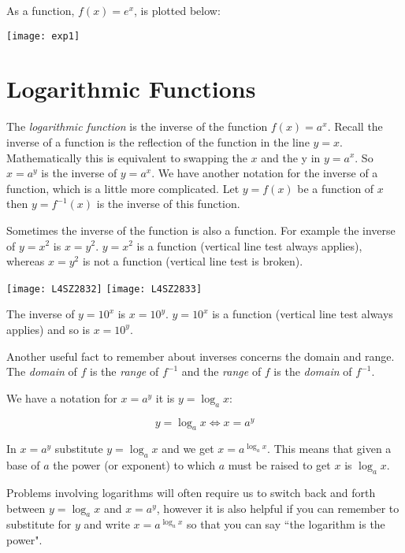 As a function, $f(x)=e^x$, is plotted below:
\begin{center}
	\texttt{[image: exp1]}
\end{center}
\section{Logarithmic Functions}
The \emph{logarithmic function} is the inverse of the function $f (x) =a^{x}$. Recall the inverse of a function is the reflection of the function in the line $y =x$. Mathematically this is equivalent to swapping the $x$ and the y in $y =a^{x}$. So $x =a^{y}$ is the inverse of $y =a^{x}$. We have another notation for the inverse of a function, which is a little more complicated. Let $y =f (x)$ be a function of $x$ then $y =f^{ -1} (x)$ is the inverse of this function. 

Sometimes the inverse of the function is also a function. For example the inverse of $y =x^{2}$ is $x =y^{2}$. $y =x^{2}$ is a function (vertical line test always applies), whereas $x =y^{2}$ is not a function (vertical line test is broken). 

\begin{multicols}{2}
\texttt{[image: L4SZ2832]}
\texttt{[image: L4SZ2833]}
\end{multicols}

The inverse of $y =10^{x}$ is $x =10^{y}$. $y =10^{x}$ is a function (vertical line test always applies) and so is $x =10^{y}$. 

Another useful fact to remember about inverses concerns the domain and range. The \emph{domain}
of $f$ is the \emph{range} of $f^{ -1}$ and the \emph{range} of $f$ is the \emph{domain} of $f^{ -1}$. 

We have a notation for $x =a^{y}$ it is $y =\log _{a} x$:
\begin{tcolorbox}
\[y =\log _{a} x \Leftrightarrow x =a^y
\]
\end{tcolorbox}


In $x =a^{y}$ substitute $y =\log _{a} x$ and we get $x =a^{\log _{a} x}$. This means that given a base of $a$ the power (or exponent) to which $a$ must be raised to get $x$ is $\log _{a} x$. 

Problems involving logarithms will often require us to switch back and forth between $y =\log _{a} x$ and $x =a^{y}$, however it is also helpful if you can remember to substitute for $y$ and write $x =a^{\log _{a} x}$ so that you can say ``the logarithm is the power". 

